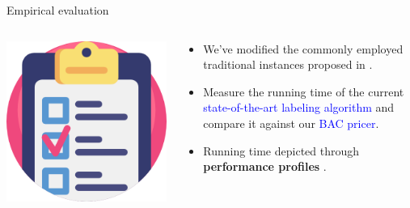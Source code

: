 \begin{frame}{Empirical evaluation}
	\begin{columns}
		\begin{column}{0.2\textwidth}
			\centering
			\includegraphics[width=\textwidth]{./Imgs/testing.png}
		\end{column}
		\begin{column}{0.8\textwidth}
			\begin{itemize}
				\item We've modified the commonly employed traditional instances proposed in
				      \cite{dantzig1959, christofides1969, gaskell1967bases, gillett1974heuristic,christofides1979vehicle,fisher1994,augerat1995}.
				\item Measure the running time of the current \textcolor{blue}{state-of-the-art labeling algorithm} \cite{pessoa2020generic} and compare it against our \textcolor{blue}{BAC pricer}.
				\item Running time depicted through \textbf{performance profiles} \parencite{dolan2002}.
			\end{itemize}
		\end{column}
	\end{columns}
\end{frame}

\newcommand{\IncludeTimeProfile}[1]{
	\centering
	\texttt{[image: ./Imgs/perfprofs/\#1/Time\_plot.cropped.pdf]}
}

